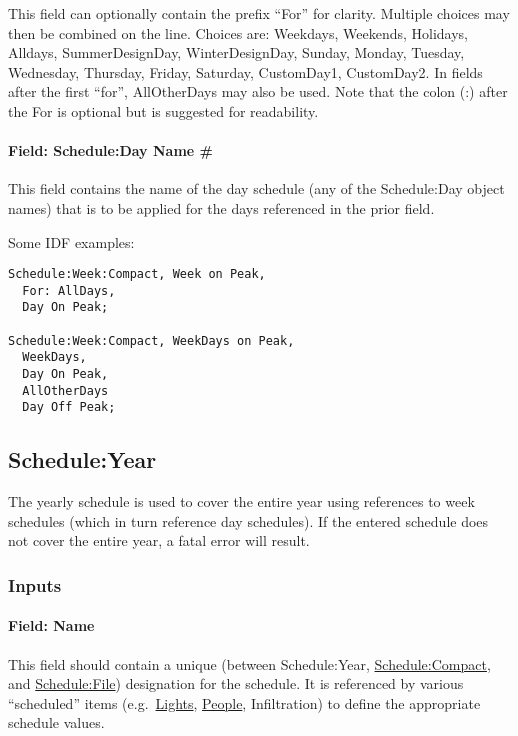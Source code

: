 This field can optionally contain the prefix ``For'' for clarity. Multiple choices may then be combined on the line. Choices are: Weekdays, Weekends, Holidays, Alldays, SummerDesignDay, WinterDesignDay, Sunday, Monday, Tuesday, Wednesday, Thursday, Friday, Saturday, CustomDay1, CustomDay2. In fields after the first ``for'', AllOtherDays may also be used. Note that the colon (:) after the For is optional but is suggested for readability.

\paragraph{Field: Schedule:Day Name \#}\label{field-scheduleday-name}

This field contains the name of the day schedule (any of the Schedule:Day object names) that is to be applied for the days referenced in the prior field.

Some IDF examples:

\begin{lstlisting}
Schedule:Week:Compact, Week on Peak,
  For: AllDays,
  Day On Peak;

Schedule:Week:Compact, WeekDays on Peak,
  WeekDays,
  Day On Peak,
  AllOtherDays
  Day Off Peak;
\end{lstlisting}

\subsection{Schedule:Year}\label{scheduleyear}

The yearly schedule is used to cover the entire year using references to week schedules (which in turn reference day schedules). If the entered schedule does not cover the entire year, a fatal error will result.

\subsubsection{Inputs}\label{inputs-6-023}

\paragraph{Field: Name}\label{field-name-5-021}

This field should contain a unique (between Schedule:Year, \hyperref[schedulecompact]{Schedule:Compact}, and \hyperref[schedulefile]{Schedule:File}) designation for the schedule. It is referenced by various ``scheduled'' items (e.g.~\hyperref[lights-000]{Lights}, \hyperref[people]{People}, Infiltration) to define the appropriate schedule values.

